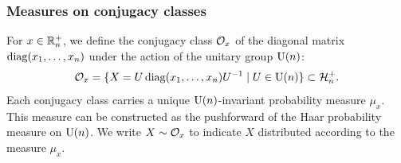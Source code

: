 \documentclass[notitlepage, 11pt, letterpaper]{amsart}
\begin{document}
\subsubsection{Measures on conjugacy classes}
For $x \in \mathbb R^{+}_{n}$, we define the conjugacy class $\mathcal O_x$ of the diagonal matrix
$\operatorname{diag}(x_1, \ldots, x_n)$ under the action of the unitary group $\operatorname{U}(n)$:
\begin{equation}
    \mathcal O_x = \{ X = U\operatorname{diag}(x_1, \ldots, x_n)U^{-1} \mid U \in \operatorname{U}(n)\} \subset \mathcal H^{+}_{n}.
\end{equation}
Each conjugacy class carries a unique $\operatorname{U}(n)$-invariant probability measure $\mu_x$.
This measure can be constructed as the pushforward of the Haar probability measure on $\operatorname{U}(n)$.
We write $X \sim \mathcal O_x$ to indicate $X$ distributed according to the measure $\mu_x$.
\end{document}
